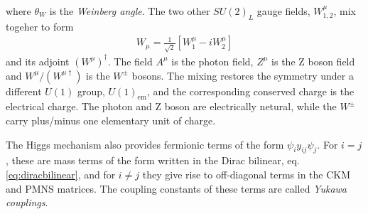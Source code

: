 where $\theta_W$ is the {\it Weinberg angle}. The two other $SU(2)_L$ gauge fields, $W_{1,2}^\mu$, mix togeher to form
\begin{align}
	W_\mu = \frac{1}{\sqrt{2}} \left[ W_1^\mu - iW_2^\mu \right]
\end{align}
and its adjoint $(W^\mu)^\dag$. The field $A^\mu$ is the photon field, $Z^\mu$ is the Z boson field and $W^\mu/(W^{\mu\dag})$ is the $W^\pm$ bosons. The mixing restores the symmetry under a different $U(1)$ group, $U(1)_\mathrm{em}$, and the corresponding conserved charge is the electrical charge. The photon and Z boson are electrically netural, while the $W^\pm$ carry plus/minus one elementary unit of charge.

The Higgs mechanism also provides fermionic terms of the form $\psi_i y_{ij} \psi_j$. For $i=j$, these are mass terms of the form written in the Dirac bilinear, eq. \eqref{eq:diracbilinear}, and for $i\neq j$ they give rise to off-diagonal terms in the CKM and PMNS matrices. The coupling constants of these terms are called {\it Yukawa couplings}.

